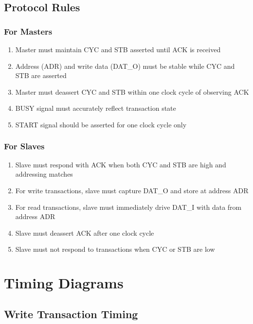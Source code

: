 \documentclass[12pt,a4paper]{article}
\begin{document}
\subsection{Protocol Rules}

\subsubsection{For Masters}
\begin{enumerate}
    \item Master must maintain CYC and STB asserted until ACK is received
    \item Address (ADR) and write data (DAT\_O) must be stable while CYC and STB are asserted
    \item Master must deassert CYC and STB within one clock cycle of observing ACK
    \item BUSY signal must accurately reflect transaction state
    \item START signal should be asserted for one clock cycle only
\end{enumerate}

\subsubsection{For Slaves}
\begin{enumerate}
    \item Slave must respond with ACK when both CYC and STB are high and addressing matches
    \item For write transactions, slave must capture DAT\_O and store at address ADR
    \item For read transactions, slave must immediately drive DAT\_I with data from address ADR
    \item Slave must deassert ACK after one clock cycle
    \item Slave must not respond to transactions when CYC or STB are low
\end{enumerate}

\section{Timing Diagrams}

\subsection{Write Transaction Timing}
\end{document}
